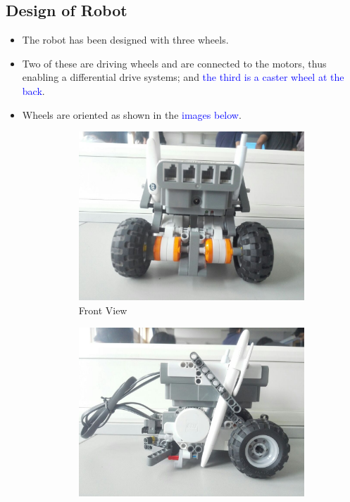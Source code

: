 \documentclass[10pt,a4paper]{article}
\begin{document}
	\subsection{Design of Robot}
		\begin{itemize}
			\item The robot has been designed with three wheels.
			\item Two of these are driving wheels and are connected to the motors, thus enabling a differential drive systems; and \textcolor{blue}{the third is a caster wheel at the back}.
			\item Wheels are oriented as shown in the \textcolor{blue}{images below}.
			\begin{figure}[H]
				\begin{subfigure}{0.5\textwidth}
					\centering
					\includegraphics[width=0.8\linewidth]{img/front.jpeg}
					\caption{Front View}
					\label{fig:fview}
				\end{subfigure}%
				\begin{subfigure}{0.5\textwidth}
					\centering
					\includegraphics[width=0.8\linewidth]{img/right.jpeg}

\end{subfigure}
\end{figure}
\end{itemize}
\end{document}
